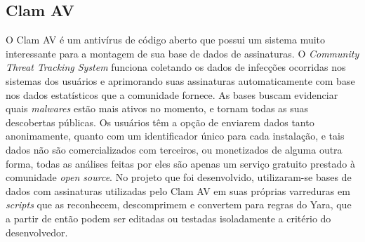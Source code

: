 \subsection{Clam AV}
\label{sub:clamav}

O Clam AV é um antivírus de código aberto que possui um sistema muito
interessante para a montagem de sua base de dados de assinaturas. O
\textit{Community Threat Tracking System} funciona coletando os dados de
infecções ocorridas nos sistemas dos usuários e aprimorando suas assinaturas
automaticamente com base nos dados estatísticos que a comunidade fornece. As
bases buscam evidenciar quais \textit{malwares} estão mais ativos no momento, e
tornam todas as suas descobertas públicas. Os usuários têm a opção de enviarem
dados tanto anonimamente, quanto com um identificador único para cada
instalação, e tais dados não são comercializados com terceiros, ou monetizados
de alguma outra forma, todas as análises feitas por eles são apenas um serviço
gratuito prestado à comunidade \textit{open source}. No projeto que foi
desenvolvido, utilizaram-se bases de dados com assinaturas utilizadas pelo Clam
AV em suas próprias varreduras em \textit{scripts} que as reconhecem,
descomprimem e convertem para regras do Yara, que a partir de então podem ser
editadas ou testadas isoladamente a critério do desenvolvedor.
